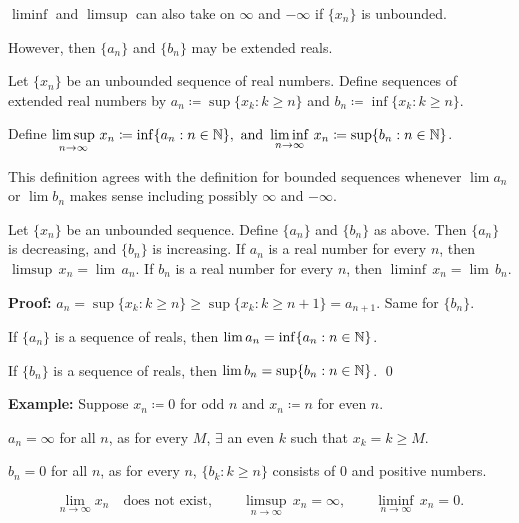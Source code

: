 \documentclass[10pt,aspectratio=149]{beamer}
\begin{document}
\begin{frame}

$\liminf$ and $\limsup$ can also take on $\infty$ and $-\infty$
if $\{x_n \}$ is unbounded.

\pause
However, then $\{ a_n \}$ and $\{ b_n \}$ may be extended reals.

\pause
\begin{definition}
Let $\{ x_n \}$ be an unbounded sequence of real numbers.  Define 
sequences of extended real numbers by
$a_n \coloneqq \sup \{ x_k : k \geq n \}$ and
$b_n \coloneqq \inf \{ x_k : k \geq n \}$.

\pause
\medskip

Define \quad
$\displaystyle
\limsup_{n \to \infty} \, x_n \coloneqq \inf \{ a_n : n \in {\mathbb{N}} \}, ~\text{and}~
\liminf_{n \to \infty} \, x_n \coloneqq \sup \{ b_n : n \in {\mathbb{N}} \}$.
\end{definition}

\pause
This definition agrees with the definition for bounded
sequences whenever $\lim a_n$ or $\lim b_n$ makes sense including
possibly $\infty$ and $-\infty$.

\pause
\begin{proposition}
Let $\{ x_n \}$ be an unbounded sequence.  Define 
$\{ a_n \}$ and $\{ b_n \}$ as above.
Then $\{ a_n \}$ is decreasing, and $\{ b_n \}$ is increasing.
If $a_n$ is a real number for every $n$, then
$\limsup \, x_n = \lim \, a_n$. 
If $b_n$ is a real number for every $n$, then
$\liminf \, x_n = \lim \, b_n$.
\end{proposition}

\pause
\textbf{Proof:}
$a_n = \sup \{ x_k : k \geq n \} \geq \sup \{ x_k : k \geq n+1 \} =
a_{n+1}$.  Same for $\{ b_n \}$.

\pause
If $\{ a_n \}$ is a sequence of reals, then
$\lim a_n = \inf \{ a_n : n \in {\mathbb{N}} \}$.

\pause
If $\{ b_n \}$ is a sequence of reals, then
$\lim b_n = \sup \{ b_n : n \in {\mathbb{N}} \}$.
\qed

\end{frame}

\begin{frame}

\textbf{Example:}
Suppose 
$x_n \coloneqq 0$ for odd $n$ and $x_n \coloneqq n$ for even $n$.

\pause
\medskip

$a_n = \infty$ for all $n$, as for every $M$,
$\exists$ an even $k$ such that $x_k = k \geq M$.

\pause
\medskip

$b_n = 0$ for all $n$, as for every $n$, 
$\{ b_k : k \geq n \}$ consists of $0$ and positive numbers.

\pause

\begin{equation*}
\lim_{n\to \infty} x_n \quad \text{does not exist},
\qquad 
\limsup_{n\to \infty} \, x_n = \infty ,
\qquad 
\liminf_{n\to \infty} \, x_n = 0.
\end{equation*}

\end{frame}
\end{document}
